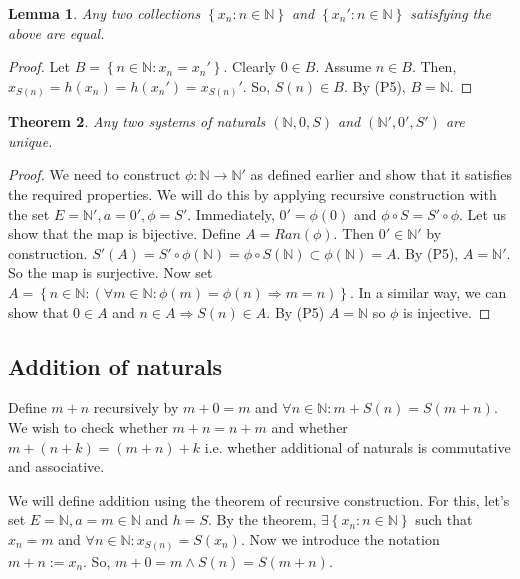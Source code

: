 \documentclass{article}
\newcommand\N{\ensuremath{\mathbb{N}}}
\newtheorem{theorem}{Theorem}[section]
\newtheorem{lemma}[theorem]{Lemma}
\theoremstyle{definition}
\theoremstyle{remark}
\theoremstyle{plain}
\begin{document}
\begin{lemma}
    Any two collections \(\left\{ x_n: n\in \N \right\}\) and \(\left\{ x_n': n \in \N \right\}\) satisfying the above are equal. 
\end{lemma}

\begin{proof}
    Let \(B = \left\{ n \in \N: x_n = x_n' \right\}\). Clearly \(0 \in B\). Assume \(n \in B\). Then, \(x_{S(n)} = h(x_n) = h(x_n') = x_{S(n)}'\). So, \(S(n)\in B\). By (P5), \(B = \N\).
\end{proof}

\begin{theorem}
    Any two systems of naturals \((\N, 0, S)\) and \((\N', 0', S')\) are unique.
\end{theorem}

\begin{proof}
    We need to construct \(\phi: \N \to \N'\) as defined earlier and show that it satisfies the required properties.
    We will do this by applying recursive construction with the set \(E = \N', a=0', \phi = S'\). Immediately, \(0' = \phi(0)\) and \(\phi \circ S = S'\circ \phi \). 
    Let us show that the map is bijective. Define \(A = Ran(\phi)\). Then \(0' \in \N'\) by construction. \(S'(A) = S'\circ \phi (\N) = \phi \circ S(\N) \subset \phi(\N) = A\).
    By (P5), \(A = \N'\). So the map is surjective. Now set \(A = \left\{ n\in \N : (\forall m \in \N : \phi(m) = \phi(n) \Rightarrow m=n) \right\}\). In a similar way, 
    we can show that \(0 \in A\) and \(n \in A \Rightarrow S(n) \in A\). By (P5) \(A = \N\) so \(\phi\) is injective.
\end{proof}

\subsection{Addition of naturals}

Define \(m+n\) recursively by \(m+0 = m\) and \(\forall n \in \N: m + S(n) = S(m+n)\). We wish to check whether \(m+n = n+m\) and whether \(m + (n+k) = (m+n)+k\) i.e. 
whether additional of naturals is commutative and associative.

We will define addition using the theorem of recursive construction. For this, let's set \(E = \N, a = m \in \N\) and \(h = S\). 
By the theorem, \(\exists \left\{ x_n : n\in \N \right\}\) such that \(x_n = m\) and \( \forall n \in \N : x_{S(n)} = S(x_n)\). 
Now we introduce the notation \(m+n := x_n\). So, \(m+0 = m \land S(n) = S(m+n)\).
\end{document}
